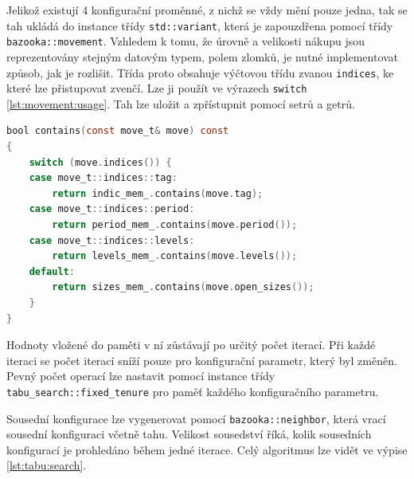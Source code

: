 Jelikož existují 4 konfigurační proměnné, z nichž se vždy mění pouze jedna, tak se tah ukládá do instance třídy \texttt{std::variant}, která je zapouzdřena pomocí třídy \texttt{bazooka::movement}.
Vzhledem k tomu, že úrovně a velikosti nákupu jsou reprezentovány stejným datovým typem, polem zlomků, je nutné implementovat způsob, jak je rozlišit.
Třída proto obsahuje výčtovou třídu zvanou \texttt{indices}, ke které lze přistupovat zvenčí.
Lze ji použít ve výrazech \texttt{switch} \ref{lst:movement:usage}.
Tah lze uložit a zpřístupnit pomocí setrů a getrů.

\begin{lstlisting}[caption={~Použití třídy \texttt{bazooka::movement}},label={lst:movement:usage},captionpos=t,abovecaptionskip=-\medskipamount,belowcaptionskip=\medskipamount,language=C]
bool contains(const move_t& move) const
{
    switch (move.indices()) {
    case move_t::indices::tag:
        return indic_mem_.contains(move.tag);
    case move_t::indices::period:
        return period_mem_.contains(move.period());
    case move_t::indices::levels:
        return levels_mem_.contains(move.levels());
    default:
        return sizes_mem_.contains(move.open_sizes());
    }
}
\end{lstlisting}

Hodnoty vložené do paměti v ní zůstávají po určitý počet iterací.
Při každé iteraci se počet iterací sníží pouze pro konfigurační parametr, který byl změněn.
Pevný počet operací lze nastavit pomocí instance třídy \texttt{tabu\_search::fixed\_tenure} pro paměť každého konfiguračního parametru.

Sousední konfigurace lze vygenerovat pomocí \texttt{bazooka::neighbor}, která vrací sousední konfiguraci včetně tahu.
Velikost sousedství říká, kolik sousedních konfigurací je prohledáno během jedné iterace.
Celý algoritmus lze vidět ve výpise \ref{lst:tabu:search}.


